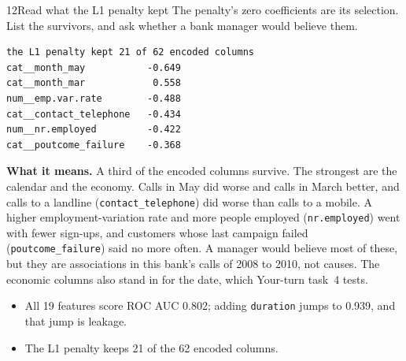 \begin{labquestion}{12}{Read what the L1 penalty kept}
The penalty's zero coefficients are its selection. List the survivors, and ask whether a bank manager would believe them.
\end{labquestion}
\begin{labanswer}

\begin{refoutput}
\begin{lstlisting}[style=utpterminal]
the L1 penalty kept 21 of 62 encoded columns
cat__month_may           -0.649
cat__month_mar            0.558
num__emp.var.rate        -0.488
cat__contact_telephone   -0.434
num__nr.employed         -0.422
cat__poutcome_failure    -0.368
\end{lstlisting}
\end{refoutput}

\textbf{What it means.} A third of the encoded columns survive. The strongest are the calendar and the economy. Calls in May did worse and calls in March better, and calls to a landline (\texttt{contact\_telephone}) did worse than calls to a mobile. A higher employment-variation rate and more people employed (\texttt{nr.employed}) went with fewer sign-ups, and customers whose last campaign failed (\texttt{poutcome\_failure}) said no more often. A manager would believe most of these, but they are associations in this bank's calls of 2008 to 2010, not causes. The economic columns also stand in for the date, which Your-turn task~4 tests.
\end{labanswer}

\begin{labcheckpoint}
\begin{itemize}[leftmargin=1.2em,itemsep=2pt,topsep=1pt]
  \item All 19 features score ROC AUC 0.802; adding \texttt{duration} jumps to 0.939, and that jump is leakage.
  \item The L1 penalty keeps 21 of the 62 encoded columns.
\end{itemize}
\end{labcheckpoint}



